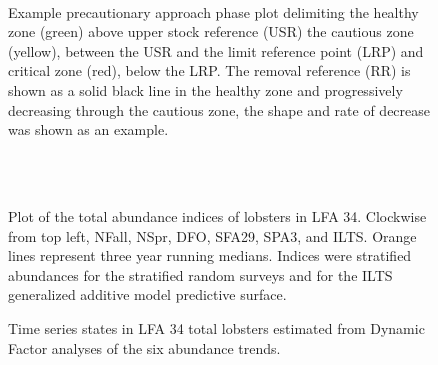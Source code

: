 \documentclass[11pt]{article}
\newcommand{\e}{/SpinDr/backup/bio_data/bio.lobster/figures/LFA3438Framework2019/} %
\begin{document}
\begin{figure}

   \\
                     \caption{Example precautionary approach phase plot delimiting the healthy zone (green) above upper stock reference (USR) the cautious zone (yellow), between the USR and the limit reference point (LRP) and critical zone (red), below the LRP. The removal reference (RR) is shown as a solid black line in the healthy zone and progressively decreasing through the cautious zone, the shape and rate of decrease was shown as an example.}
\end{figure}



\begin{landscape}
\begin{figure}
        \centering
    \\
                \\
        
         \caption{Plot of the total abundance indices of lobsters in LFA 34. Clockwise from top left, NFall, NSpr, DFO, SFA29, SPA3, and ILTS.
         Orange lines represent three year running medians. Indices were stratified abundances for the stratified random surveys and for the ILTS generalized additive model predictive surface.}
        \end{figure}
\end{landscape}

   \begin{figure}
    \centering
        \caption{Time series states in LFA 34 total lobsters estimated from Dynamic Factor analyses of the six abundance trends.}

    \end{figure}
\end{document}
